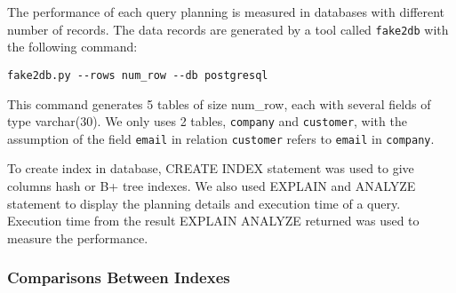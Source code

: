 \documentclass[a4paper]{article}
\begin{document}
The performance of each query planning is measured in databases with different number of records. The data records are generated by a tool called \texttt{fake2db}\cite{26} with the following command: 
\begin{lstlisting}
fake2db.py --rows num_row --db postgresql
\end{lstlisting}
This command generates 5 tables of size num\_row, each with several fields of type varchar(30). We only uses 2 tables, \texttt{company} and \texttt{customer}, with the assumption of the field \texttt{email} in relation \texttt{customer} refers to \texttt{email} in \texttt{company}.

To create index in database, CREATE INDEX statement was used to give columns hash or B+ tree indexes. We also used EXPLAIN and ANALYZE statement to display the planning details and execution time of a query. Execution time from the result EXPLAIN ANALYZE returned was used to measure the performance.

\subsubsection{Comparisons Between Indexes}
\end{document}
